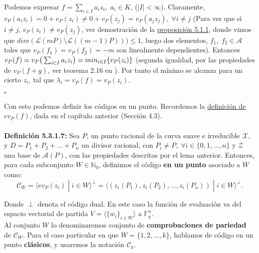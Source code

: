 \documentclass[11pt,spanish]{book}
\newcommand{\qed}{\begin{flushright} $\square$ \end{flushright}}
\newcommand{\X}{\mathbf{\mathcal{X}}}
\begin{document}
Podemos expresar $f=\sum_{i\in I}a_{i}z_{i},\;a_i\in K$, ($|I|<\infty$). Claramente, $v_P(a_i z_i)=0+v_P(z_i)\neq0+v_P(z_j)=v_P(a_j z_j),\;\forall i\neq j$ (Para ver que si $i\neq j$, $v_P(z_i)\neq v_P(z_j)$, ver demostración de la \hyperlink{prop5.1.1}{proposición 5.1.1}, donde vimos que $dim(\mathcal{L}(mP)\setminus\mathcal{L}((m-1)P)))\leq 1$, luego dos elementos, $f_1,\;f_2\in\mathcal{A}$ tales que $v_P(f_1)=v_P(f_2)=-m$ son linealmente dependientes).  Entonces $v_P(f)=v_P\big{(}\sum_{i\in I}a_i z_i\big{)}=min_{i\in I}\{v_P(z_i)\}$ (segunda igualdad, por las propiedades de $v_P(f+g)$, ver teorema 2.16 en \cite{Tom-Høholdt}). Por tanto el mínimo se alcanza para un cierto $z_i$, tal que $\lambda_i=v_P(f)=v_P(z_i)$. 
\qed

Con esto podemos definir los códigos en un punto. Recordemos la \hyperlink{evP}{definición de $ev_P(f)$}, dada en el capítulo anterior (Sección 4.3).\\
\\ \hypertarget{def5.3.1.7}{\textbf{Definición 5.3.1.7:}} Sea $P$, un punto racional de la curva suave e irreducible $\mathbf{\mathcal{X}}$, y $D=P_1+P_2+\ldots+P_n$ un divisor racional, con $P_i\neq P,\;\forall i\in\{0,1,\ldots,n\}$ y $\mathcal{Z}$ una base de $\mathcal{A}(P)$, con las propiedades descritas por el lema anterior. Entonces, para cada subconjunto $W\in\mathbb{N}_0$, definimos el código \textbf{en un punto} asociado a $W$ como:
$$\mathcal{C}_{W}=\langle ev_{P}(z_i)\;|\; i\in W\rangle^{\perp}=\langle (z_i(P_1),z_i(P_2),\ldots,z_i(P_n))\;|\; i\in W\rangle^{\perp}.$$

Donde $\perp$ denota el código dual. En este caso la función de evaluación va del espacio vectorial de partida $V=\langle \{w_i\}_{i\in W} \rangle$ a $\mathbb{F}_q^{n}$. \\

Al conjunto $W$ lo denominaremos conjunto de \textbf{comprobaciones de pariedad} de $\mathcal{C}_W$. Para el caso particular en que $W=\{1,2,\ldots,k\}$, hablamos de código en un punto \textbf{clásicos}, y usaremos la notación $\mathcal{C}_k$. \\
\\
\end{document}
